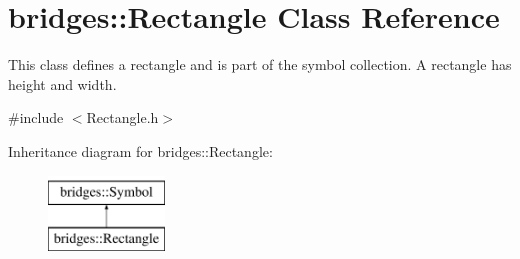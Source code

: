 \hypertarget{classbridges_1_1_rectangle}{}\section{bridges\+::Rectangle Class Reference}
\label{classbridges_1_1_rectangle}


This class defines a rectangle and is part of the symbol collection. A rectangle has height and width.  




{\ttfamily \#include $<$Rectangle.\+h$>$}

Inheritance diagram for bridges\+::Rectangle\+:\begin{figure}[H]
\begin{center}
\leavevmode
\includegraphics[height=2.000000cm]{classbridges_1_1_rectangle}
\end{center}
\end{figure}
